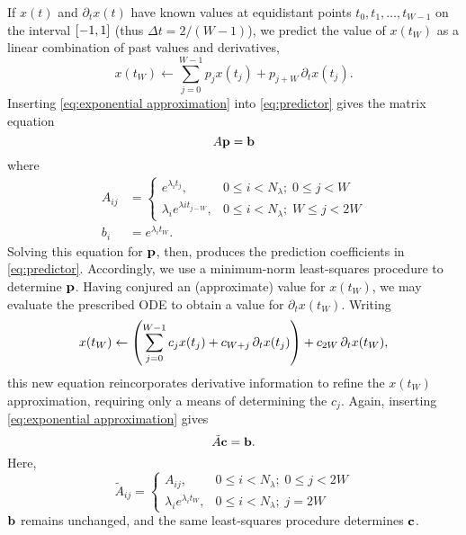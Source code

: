 If $x(t)$ and $\partial_t x(t)$ have known values at equidistant points $t_0, t_1, \ldots, t_{W - 1}$ on the interval $\qty[-1, 1]$ (thus $\Delta t = 2/(W - 1)$), we predict the value of $x(t_W)$ as a linear combination of past values and derivatives,
\begin{equation}
  x(t_W) \leftarrow \sum_{j = 0}^{W - 1} p_j x(t_j) + p_{j + W} \, \partial_t x(t_j).
  \label{eq:predictor}
\end{equation}
Inserting \cref{eq:exponential approximation} into \cref{eq:predictor} gives the matrix equation
\begin{equation}
  A \vb{p} = \vb{b}
  \label{eq:predictor vector}
\end{equation}
where
\begin{subequations}
\begin{align}
  A_{ij} &= \begin{cases}
    e^{\lambda_i t_j}, & 0 \leqslant i < N_\lambda; \; 0 \leqslant j < W \\
    \lambda_i e^{\lambda i t_{j - W}}, & 0 \leqslant i < N_\lambda; \; W \leqslant j < 2 W
  \end{cases} \label{eq:a matrix}\\
  b_i &= e^{\lambda_i t_W}. \label{eq:b vector}
\end{align}
\end{subequations}
Solving this equation for $\vb{p}$, then, produces the prediction coefficients in \cref{eq:predictor}.
Accordingly, we use a minimum-norm least-squares procedure to determine $\vb{p}$.
Having conjured an (approximate) value for $x(t_W)$, we may evaluate the prescribed ODE to obtain a value for $\partial_t x(t_W)$.
Writing
\begin{equation}
  x(t_W) \leftarrow \qty(\sum_{j = 0}^{W - 1} c_j x(t_j) + c_{W + j} \, \partial_t x(t_j)) + c_{2W} \, \partial_t x(t_W),
\end{equation}
this new equation reincorporates derivative information to refine the $x(t_W)$ approximation, requiring only a means of determining the $c_j$.
Again, inserting \cref{eq:exponential approximation} gives
\begin{equation}
  \tilde{A} \vb{c} = \vb{b}.
\end{equation}
Here,
\begin{equation}
  \tilde{A}_{ij} = \begin{cases}
    A_{ij}, & 0 \leqslant i < N_\lambda; \; 0 \leqslant j < 2W \\
    \lambda_i e^{\lambda_i t_W}, & 0 \leqslant i < N_\lambda; \; j = 2W
  \end{cases}
\end{equation}
$\vb{b}$ remains unchanged, and the same least-squares procedure determines $\vb{c}$.

